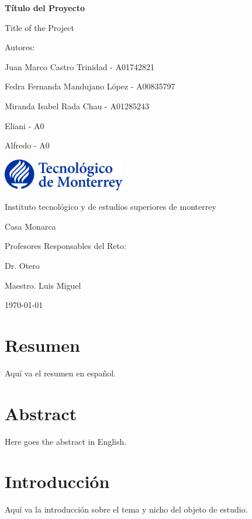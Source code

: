 \documentclass[a4paper,12pt]{report}
\begin{document}
\begin{titlepage}
    \centering
    {\Huge \bfseries Título del Proyecto \par}
    {\Large Title of the Project \par}
    \vspace{1cm}
    {\Large Autores: \par}
    \vspace{0.5cm}
    {\large Juan Marco Castro Trinidad - A01742821 \par}
    {\large Fedra Fernanda Mandujano López - A00835797 \par}
    {\large Miranda Isabel Rada Chau - A01285243 \par}
    {\large Eliani - A0 \par}
    {\large Alfredo - A0 \par}
    \vfill
    \includegraphics[width=0.4\textwidth]{logo_tec.png} \par
    \vspace{0.5cm}
    {\Large Instituto tecnológico y de estudios superiores de monterrey  \par}
    {\Large Casa Monarca \par}
    \vfill
    {\Large Profesores Responsables del Reto: \par}
    {\large Dr. Otero \par}
    {\large Maestro. Luis Miguel \par}
    \vfill
    {\large \today \par}
\end{titlepage}

\tableofcontents
\newpage

\chapter*{Resumen}
Aquí va el resumen en español.

\chapter*{Abstract}
Here goes the abstract in English.

\chapter{Introducción}
Aquí va la introducción sobre el tema y nicho del objeto de estudio.
\end{document}
